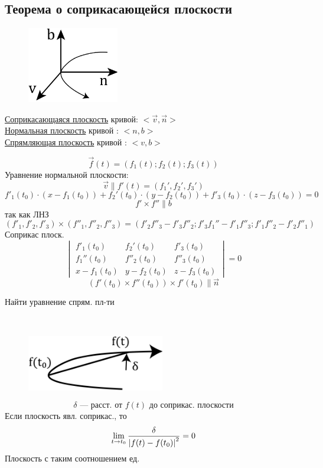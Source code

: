 \documentclass[main]{subfiles}
\begin{document}
\subsection{Теорема о соприкасающейся плоскости}

	\begin{definition}
		\begin{figure}[H]
		    \includegraphics[width=4cm]{pics/4_1.png}
		    \centering
		\end{figure}

	    \ul{Соприкасающаяся плоскость} кривой: $<\vec{v}, \vec{n}>$\\
		\ul{Нормальная плоскость} кривой : $<n, b>$\\
		\ul{Спрямляющая плоскость} кривой : $<v, b>$
	\end{definition}

	\begin{Theorem}
		\[\vec{f}(t) = (f_1(t); f_2(t); f_3(t))\]
		Уравнение нормальной плоскости:
		\[\vec{v} \parallel f'(t) = (f_1', f_2', f_3')\]
        \[f'_1(t_0) \cdot(x - f_1(t_0)) +
		f_2'(t_0) \cdot (y - f_2(t_0)) + f'_3(t_0) \cdot (z - f_3(t_0)) = 0\]
		\[f' \times f'' \parallel b\]
		так как ЛНЗ
		\[(f'_1, f'_2, f'_3) \times (f''_1, f''_2, f''_3) = (f'_2 f''_3 - f'_3 f''_2;
		f'_3 f_1'' - f'_1 f''_3; f'_1 f''_2 - f'_2 f''_1)\]
		Соприкас плоск.
		\[\begin{vmatrix}
			f'_1(t_0) & f_2'(t_0) & f'_3(t_0)\\
			f_1''(t_0) & f''_2(t_0) & f''_3(t_0)\\
			x - f_1(t_0) & y - f_2(t_0) & z - f_3(t_0)
		\end{vmatrix} = 0\]
		\[(f'(t_0) \times f''(t_0)) \times f'(t_0) \parallel \vec{n}\]
	\end{Theorem}

	\begin{upr}
		Найти уравнение спрям. пл-ти
	\end{upr}

	\begin{Theorem}\
		\begin{figure}[H]
		    \includegraphics[width=6cm]{pics/4_2.png}
		    \centering
		\end{figure}

		\[\delta \text{ --- расст. от } f(t) \text{ до соприкас. плоскости}\]
		Если плоскость явл. соприкас., то
		\[\lim_{t \to t_0} \frac{\delta}{\left|f(t) - f(t_0)\right|^2} = 0 \]
		Плоскость с таким соотношением ед.
	\end{Theorem}
\end{document}
